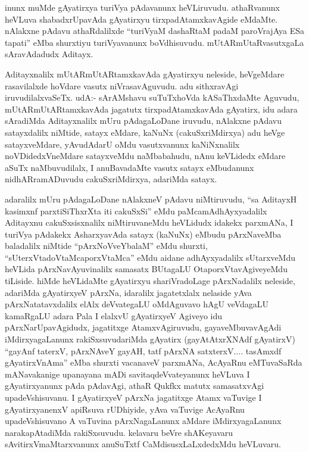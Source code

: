 \begin{artha}
inunx muMde gAyatirxya turiVya pAdavanunx heVLiruvudu. athaRvanunx heVLuva shabadxrUpavAda gAyatirxyu tirxpadAtamxkavAgide eMdaMte. nAlakxne pAdavu athaRdalilxde ``turiVyaM dashaRtaM padaM paroVrajAya ESa tapati'' eMba shurxtiyu turiVyavanunx boVdhisuvudu. mUtARmUtaRvasutxgaLa sAravAdadudx Aditayx. 

Aditayxnalilx mUtARmUtARtamxkavAda gAyatirxyu neleside, heVgeMdare rasavilalxde hoVdare vasutx niVrasavAguvudu. adu sithxravAgi iruvudilalxvaSeTx. udA:- sArAMshavu suTuTxhoVda kASaThxdaMte Aguvudu, mUtARmUtARtamxkavAda jagatutx tirxpadAtamxkavAda gAyatirx, idu adara sAradiMda Aditayxnalilx mUru pAdagaLoDane iruvudu, nAlakxne pAdavu satayxdalilx niMtide, satayx eMdare, kaNuNx (cakuSxriMdirxya) adu heVge satayxveMdare, yAvudAdarU oMdu vasutxvanunx kaNiNxnalilx noVDidedxVneMdare satayxveMdu naMbabahudu, nAnu keVLidedx eMdare aSuTx naMbuvudilalx, I anuBavadaMte vasutx satayx eMbudanunx nidhARramADuvudu cakuSxriMdirxya, adariMda satayx. 

adaralilx mUru pAdagaLoDane nAlakxneV pAdavu niMtiruvudu, ``sa AditayxH  kasimxnf parxtiSiThxrXta iti cakuSxSi'' eMdu paMcamAdhAyxyadalilx Aditayxnu cakuSxsisxnalilx niMtiruvaneMdu heVLidudx idakekx parxmANa, I turiVya pAdakekx AsharxyavAda satayx (kaNuNx) eMbudu pArxNaveMba baladalilx niMtide ``pArxNoVveYbalaM'' eMdu shurxti, ``sUterxVtadoVtaMcaporxVtaMca'' eMdu aidane adhAyxyadalilx sUtarxveMdu heVLida pArxNavAyuvinalilx samasatx BUtagaLU OtaporxVtavAgiveyeMdu tiLiside. hiMde heVLidaMte gAyatirxyu shariVradoLage pArxNadalilx neleside, adariMda gAyatirxyeV pArxNa, idaralilx jagatetxlalx nelaside yAva pArxNatatavxdalilx elAlx deVvategaLU oMdAguvavo hAgU veVdagaLU kamaRgaLU adara Pala I elalxvU gAyatirxyeV Agiveyo idu pArxNarUpavAgidudx, jagatitxge AtamxvAgiruvudu, gayaveMbuvavAgAdi iMdirxyagaLanunx rakiSxsuvudariMda gAyatirx (gayAtAtxrXNAdf gAyatirxV) ``gayAnf taterxV, pArxNAveY gayAH, tatf pArxNA satxterxV.... tasAmxdf gAyatirxVnAma'' eMba shurxti vacanaveV parxmANa, AcAyaRnu eMTuvaSaRda mANavakanige upanayana mADi savitaqdeVvateyanunx heVLuva I gAyatirxyanunx pAda pAdavAgi, athaR Qukfkx matutx samasatxvAgi upadeVshisuvanu. I gAyatirxyeV pArxNa jagatitxge Atamx vaTuvige I gAyatirxyanenxV apiRsuva rUDhiyide, yAva vaTuvige AcAyaRnu upadeVshisuvano A vaTuvina pArxNagaLanunx aMdare iMdirxyagaLanunx narakapAtadiMda rakiSxsuvudu. kelavaru beVre shAKeyavaru sAvitirxVmaMtarxvanunx anuSuTxtf CaMdisusxLaLxdedxMdu heVLuvaru.
\end{artha}

